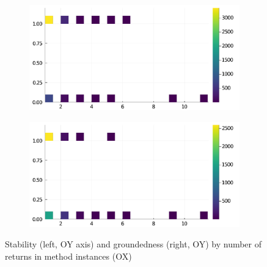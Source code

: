 \begin{figure}[h]
     \begin{subfigure}[b]{0.49\textwidth}
       \includegraphics[width=\textwidth]{figs/all-package-graphs/Gadfly-returns-vs-stable.pdf}
     \end{subfigure}
     \begin{subfigure}[b]{0.49\textwidth}
       \includegraphics[width=\textwidth]{figs/all-package-graphs/Gadfly-returns-vs-grounded.pdf}
     \end{subfigure}
\caption{Stability (left, OY axis) and groundedness (right, OY) by number of returns in method instances (OX)}%
%
\label{figs:returns:Gadfly}
\end{figure}
\clearpage
